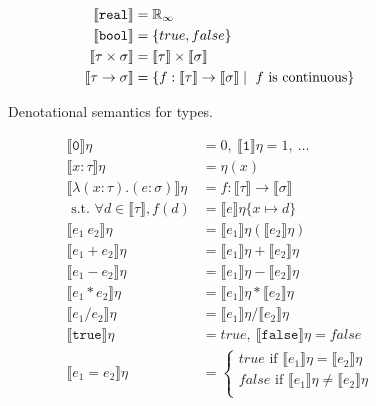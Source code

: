 \begin{figure}
 \begin{align*}
\llbracket \texttt{real} \rrbracket &= \mathbb{R}_{\infty} \\
 \llbracket \texttt{bool} \rrbracket &= {\{true, false\}} \\
 \llbracket \tau \times \sigma \rrbracket &= \llbracket \tau \rrbracket \times \llbracket \sigma \rrbracket  \\
 \llbracket \tau \rightarrow \sigma \rrbracket &= \{f: \llbracket \tau \rrbracket \rightarrow \llbracket \sigma \rrbracket \mid
 \ f \text{ is continuous}\} 
 \end{align*}
 \caption{Denotational semantics for types.}
 \label{fig:densemtypes}
 \end{figure}
 \begin{figure}
\begin{align*}
 \llbracket \texttt{0} \rrbracket\eta &= 0, \  \llbracket \texttt{1} \rrbracket\eta = 1, \ \ldots \\
  \llbracket x : \tau \rrbracket\eta &= \eta(x) \\
  \llbracket \lambda (x : \tau) . (e : \sigma) \rrbracket\eta &= f : \llbracket \tau \rrbracket \rightarrow \llbracket \sigma \rrbracket \\
\text{ s.t. } \forall d \in \llbracket \tau \rrbracket, f(d) &= \llbracket e \rrbracket\eta\{ x \mapsto d \} \\
 \llbracket e_1 \ e_2 \rrbracket \eta &= \llbracket e_1 \rrbracket\eta ( \llbracket e_2 \rrbracket\eta ) \\
 \llbracket e_1 + e_2 \rrbracket\eta &= \llbracket e_1 \rrbracket\eta + \llbracket e_2 \rrbracket\eta \\
 \llbracket e_1 - e_2 \rrbracket\eta &= \llbracket e_1 \rrbracket\eta - \llbracket e_2 \rrbracket\eta \\
 \llbracket e_1 * e_2 \rrbracket\eta &= \llbracket e_1 \rrbracket\eta * \llbracket e_2 \rrbracket\eta \\
  \llbracket e_1 / e_2 \rrbracket\eta &= \llbracket e_1 \rrbracket\eta / \llbracket e_2 \rrbracket\eta \\
  \llbracket \texttt{true} \rrbracket\eta &= true, \ \llbracket \texttt{false} \rrbracket\eta = false \\
 \llbracket e_1 = e_2 \rrbracket\eta &= 
 \begin{cases} 
      true \text{ if } \llbracket e_1 \rrbracket\eta = \llbracket e_2 \rrbracket\eta \\
      false \text{  if } \llbracket e_1 \rrbracket\eta \neq \llbracket e_2\rrbracket\eta \\

\end{cases}
\end{align*}
\end{figure}
